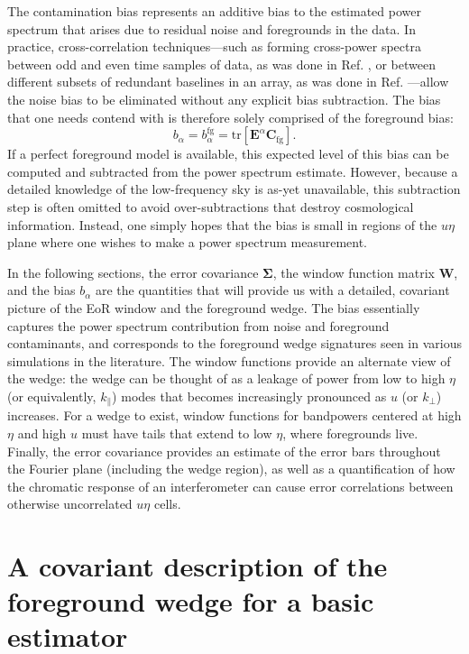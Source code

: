 \documentclass[twocolumn,aps,prd,nofootinbib,showpacs]{revtex4-1}
\begin{document}
The contamination bias represents an additive bias to the estimated power spectrum that arises due to residual noise and foregrounds in the data.  In practice, cross-correlation techniques---such as forming cross-power spectra between odd and even time samples of data, as was done in Ref. \cite{Dillon2014}, or between different subsets of redundant baselines in an array, as was done in Ref. \cite{Parsons2013}---allow the noise bias to be eliminated without any explicit bias subtraction.  The bias that one needs contend with is therefore solely comprised of the foreground bias:
\begin{equation}
\label{eq:fgBias}
b_\alpha = b^\textrm{fg}_\alpha = \textrm{tr}  [\mathbf{E}^\alpha  \mathbf{C}_\textrm{fg}] .
\end{equation}
If a perfect foreground model is available, this expected level of this bias can be computed and subtracted from the power spectrum estimate.  However, because a detailed knowledge of the low-frequency sky is as-yet unavailable, this subtraction step is often omitted to avoid over-subtractions that destroy cosmological information.  Instead, one simply hopes that the bias is small in regions of the $u\eta$ plane where one wishes to make a power spectrum measurement.

In the following sections, the error covariance $\boldsymbol \Sigma$, the window function matrix $\mathbf{W}$, and the bias $b_\alpha$ are the quantities that will provide us with a detailed, covariant picture of the EoR window and the foreground wedge.  The bias essentially captures the power spectrum contribution from noise and foreground contaminants, and corresponds to the foreground wedge signatures seen in various simulations in the literature.  The window functions provide an alternate view of the wedge: the wedge can be thought of as a leakage of power from low to high $\eta$ (or equivalently, $k_\parallel$) modes that becomes increasingly pronounced as $u$ (or $k_\perp$) increases.  For a wedge to exist, window functions for bandpowers centered at high $\eta$ and high $u$ must have tails that extend to low $\eta$, where foregrounds live.  Finally, the error covariance provides an estimate of the error bars throughout the Fourier plane (including the wedge region), as well as a quantification of how the chromatic response of an interferometer can cause error correlations between otherwise uncorrelated $u\eta$ cells.

\section{A covariant description of the foreground wedge for a basic estimator}
\label{sec:basicEstAnalytic}
\end{document}
